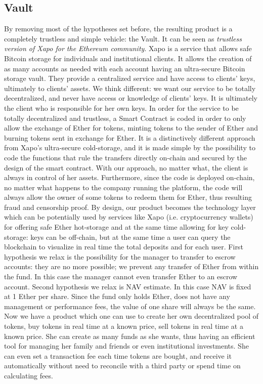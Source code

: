 \documentclass[9pt,oneside]{amsart}
\begin{document}
\begin{multicols}{2}
\section{Vault} \label{ch:minimum}
By removing most of the hypotheses set before, the resulting product is a completely trustless and simple vehicle: the Vault. It can be seen as  \textit{trustless version of Xapo for the Ethereum community}.
Xapo is a service that allows safe Bitcoin storage for individuals and institutional clients. It allows the creation of as many accounts as needed with each account having an ultra-secure Bitcoin storage vault. They provide a centralized service and have access to clients' keys, ultimately to clients' assets.
We think different: we want our service to be totally decentralized, and never have access or knowledge of clients' keys. It is ultimately the client who is responsible for her own keys. In order for the service to be totally decentralized and trustless,  a Smart Contract is coded in order to only allow the exchange of Ether for tokens, minting tokens to the sender of Ether and burning tokens sent in exchange for Ether. It is a distinctively different approach from Xapo's ultra-secure cold-storage, and it is made simple by the possibility to code the functions that rule the transfers directly on-chain and secured by the design of the smart contract. With our approach, no matter what, the client is always in control of her assets. Furthermore, since the code is deployed on-chain, no matter what happens to the company running the platform, the code will always allow the owner of some tokens to redeem them for Ether, thus resulting fraud and censorship proof.
By design, our product becomes the technology layer which can be potentially used by services like Xapo (i.e. cryptocurrency wallets) for offering safe Ether hot-storage and at the same time allowing for key cold-storage: keys can be off-chain, but at the same time a user can query the blockchain to visualize in real time the total deposits and for each user.
First hypothesis we relax is the possibility for the manager to transfer to escrow accounts: they are no more possible; we prevent any transfer of Ether from within the fund. In this case the manager cannot even transfer Ether to an escrow account.
Second hypothesis we relax is NAV estimate. In this case NAV is fixed at 1 Ether per share. Since the fund only holds Ether, does not have any management or performance fees, the value of one share will always be the same. Now we have a product which one can use to create her own decentralized pool of tokens, buy tokens in real time at a known price, sell tokens in real time at a known price. She can create as many funds as she wants, thus having an efficient tool for managing her family and friends or even institutional investments. She can even set a transaction fee each time tokens are bought, and receive it automatically without need to reconcile with a third party or spend time on calculating fees.

\end{multicols}
\end{document}
